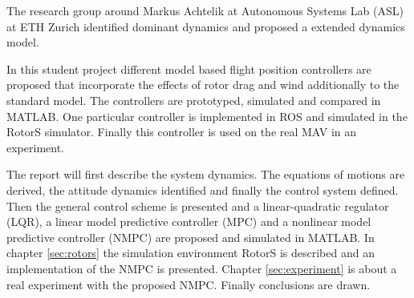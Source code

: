The research group around Markus Achtelik at Autonomous Systems Lab (ASL) at ETH Zurich identified dominant dynamics and proposed a extended dynamics model. 

In this student project different model based flight position controllers are proposed that incorporate the effects of rotor drag and wind additionally to the standard model. The controllers are prototyped, simulated and compared in MATLAB. One particular controller is implemented in ROS and simulated in the RotorS simulator. Finally this controller is used on the real MAV in an experiment.

The report will first describe the system dynamics. The equations of motions are derived, the attitude dynamics identified and finally the control system defined. Then the general control scheme is presented and a linear-quadratic regulator (LQR), a linear model predictive controller (MPC) and a nonlinear model predictive controller (NMPC) are proposed and simulated in MATLAB. In chapter \ref{sec:rotors} the simulation environment RotorS is described and an implementation of the NMPC is presented. Chapter \ref{sec:experiment} is about a real experiment with the proposed NMPC. Finally conclusions are drawn.
